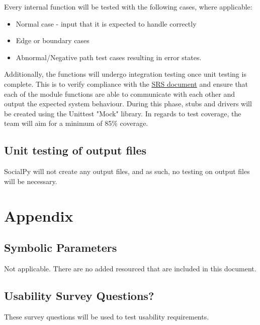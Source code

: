 \documentclass[12pt, titlepage]{article}
\begin{document}
Every internal function will be tested with the following cases, where applicable:
\begin{itemize}
    \item Normal case - input that it is expected to handle correctly
    \item Edge or boundary cases
    \item Abnormal/Negative path test cases resulting in error states.
    
\end{itemize}

Additionally, the functions will undergo integration testing once unit testing is complete. This is to verify compliance with the \href{https://gitlab.cas.mcmaster.ca/zamana11/se3xa3-project/-/tree/master/Doc/SRS)}{SRS document} and ensure that each of the module functions are able to communicate with each other and output the expected system behaviour. During this phase, stubs and drivers will be created using the Unittest "Mock" library. In regards to test coverage, the team will aim for a minimum of 85\% coverage.
		
\subsection{Unit testing of output files}	
SocialPy will not create any output files, and as such, no testing on output files will be necessary.





\newpage

\section{Appendix}
\label{Appendix}
\subsection{Symbolic Parameters}

Not applicable. There are no added resourced that are included in this document.

\subsection{Usability Survey Questions?}

These survey questions will be used to test usability requirements.
\end{document}
